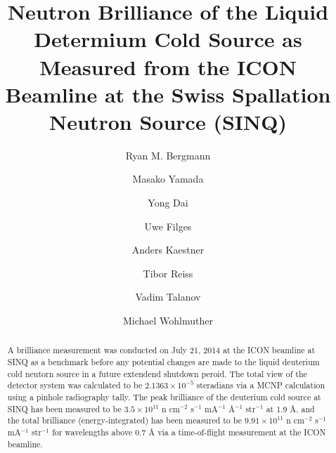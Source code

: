 \documentclass[5p,12pt]{elsarticle}
\begin{document}
\begin{frontmatter}



\title{Neutron Brilliance of the Liquid Determium Cold Source as Measured from the ICON Beamline at the Swiss Spallation Neutron Source (SINQ)}


\author[]{Ryan M. Bergmann}

\author[]{Masako Yamada}

\author[]{Yong Dai}

\author[]{Uwe Filges}

\author[]{Anders Kaestner}

\author[]{Tibor Reiss}

\author[]{Vadim Talanov}

\author[]{Michael Wohlmuther}


\address{Paul Scherrer Institut, Villigen, Switzerland}


\begin{abstract}

A brilliance measurement was conducted on July 21, 2014 at the ICON beamline at SINQ as a benchmark before any potential changes are made to the liquid deuterium cold neutorn source in a future extendend shutdown peroid. The total view of the detector system was calculated to be $2.1363\times10^{-5}$ steradians via a MCNP calculation using a pinhole radiography tally.  The peak brilliance of the deuterium cold source at SINQ has been measured to be $3.5\times10^{11}$ n cm$^{-2}$ s$^{-1}$ mA$^{-1}$ \AA$^{-1}$ str$^{-1}$ at 1.9 {\AA}, and the total brilliance (energy-integrated) has been measured to be  $9.91\times10^{11}$  n cm$^{-2}$ s$^{-1}$ mA$^{-1}$ str$^{-1}$ for wavelengths above 0.7 {\AA} via a time-of-flight measurement at the ICON beamline.


\end{abstract}
\end{frontmatter}
\end{document}
